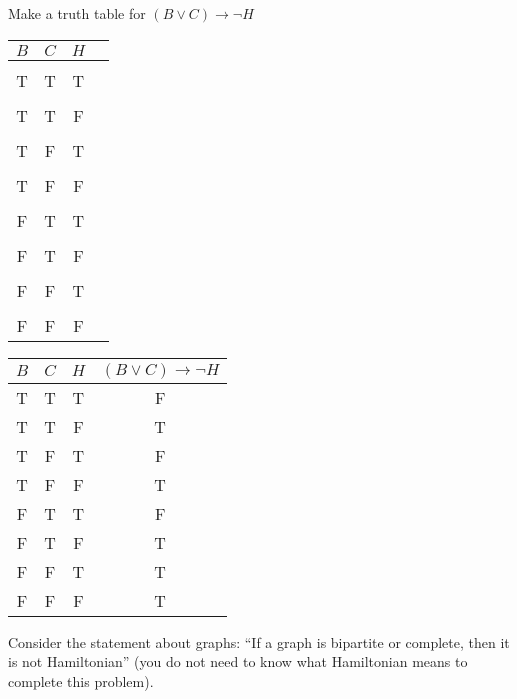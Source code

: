\documentclass[11pt]{exam}
\def\imp{\rightarrow}
\begin{document}
\begin{questions}
\newpage


\question[4] Make a truth table for $(B\vee C) \imp \neg H$

\begin{center}
  \begin{tabular}{c|c|c||c}

  $B$ & $C$ & $H$ & \hspace{5 in} \\ \hline & & & \\
  T & T & T & \\ & & & \\
  T & T & F & \\ & & & \\
  T & F & T & \\ & & & \\
  T & F & F & \\ & & & \\
  F & T & T & \\ & & & \\
  F & T & F & \\ & & & \\
  F & F & T & \\ & & & \\
  F & F & F & \\
  \end{tabular}
\end{center}

  \begin{solution}

  \begin{tabular}{c|c|c||c}

    $B$ & $C$ & $H$ & $(B\vee C) \imp \neg H $ \\ \hline
    T & T & T & F\\
    T & T & F & T\\
    T & F & T & F\\
    T & F & F & T\\
    F & T & T & F\\
    F & T & F & T\\
    F & F & T & T\\
    F & F & F & T\\
    \end{tabular}

  \end{solution}
Consider the statement about graphs: ``If a graph is bipartite or complete, then it is not Hamiltonian'' (you do not need to know what Hamiltonian means to complete this problem).


\end{questions}
\end{document}
